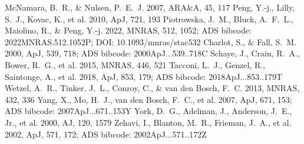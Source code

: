 \documentclass[twocolumn]{aastex631}
\begin{document}
\begin{thebibliography}{}
 McNamara, B.~R., \& Nulsen, P.~E.~J. 2007, ARA\&A, 45, 117
 Peng, Y.-j., Lilly, S.~J., Kovac, K., et al. 2010, ApJ, 721, 193
 Piotrowska, J.~M., Bluck, A.~F.~L., Maiolino, R., \& Peng, Y.-j. 2022, MNRAS, 512, 1052; ADS bibcode: 2022MNRAS.512.1052P; DOI: 10.1093/mnras/stac532
 Charlot, S., \& Fall, S.~M. 2000, ApJ, 539, 718; ADS bibcode: 2000ApJ...539..718C
 Schaye, J., Crain, R.~A., Bower, R.~G., et al. 2015, MNRAS, 446, 521
 Tacconi, L.~J., Genzel, R., Saintonge, A., et al. 2018, ApJ, 853, 179; ADS bibcode: 2018ApJ...853..179T
 Wetzel, A.~R., Tinker, J.~L., Conroy, C., \& van den Bosch, F.~C. 2013, MNRAS, 432, 336
 Yang, X., Mo, H.~J., van den Bosch, F.~C., et al. 2007, ApJ, 671, 153; ADS bibcode: 2007ApJ...671..153Y
 York, D.~G., Adelman, J., Anderson, J.~E., Jr., et al. 2000, AJ, 120, 1579
 Zehavi, I., Blanton, M.~R., Frieman, J.~A., et al. 2002, ApJ, 571, 172; ADS bibcode: 2002ApJ...571..172Z
\end{thebibliography}
\end{document}

